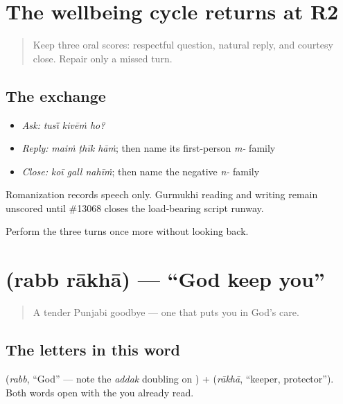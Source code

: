 \section[Practice]{The wellbeing cycle returns at R2}

\label{lesson:PA-R04-wellbeing-r2}



\begin{quote}
Keep three oral scores: respectful question, natural reply, and courtesy close. Repair only a missed turn.
\end{quote}

\subsection*{The exchange}
\begin{itemize}
\raggedright
  \item \emph{Ask:} \emph{tusī̃ kivēṁ ho?}
  \item \emph{Reply:} \emph{maiṁ ṭhīk hāṁ}; then name its first-person \emph{m-} family
  \item \emph{Close:} \emph{koī gall nahīṁ}; then name the negative \emph{n-} family
\end{itemize}

Romanization records speech only. Gurmukhi reading and writing remain unscored until \#13068 closes the load-bearing script runway.

\begin{tcolorbox}[breakable,colback=teal!4,colframe=teal!35!black,title={Before you move on}]
Perform the three turns once more without looking back.
\end{tcolorbox}
\section[\texorpdfstring{\pa{ਰੱਬ} \pa{ਰਾਖਾ} (rabb rākhā)}{ਰੱਬ ਰਾਖਾ (rabb rākhā)}]{  (rabb rākhā) — \textquotedblleft{}God keep you\textquotedblright{}}

\label{lesson:PA-C04-rab-raakha}



\begin{quote}
A tender Punjabi goodbye — one that puts you in God's care.
\end{quote}

\subsection*{The letters in this word}
\textbf{} (\emph{rabb}, \textquotedblleft{}God\textquotedblright{} — note the \emph{addak} doubling on \textbf{}) + \textbf{} (\emph{rākhā}, \textquotedblleft{}keeper, protector\textquotedblright{}). Both words open with the \textbf{} you already read.

